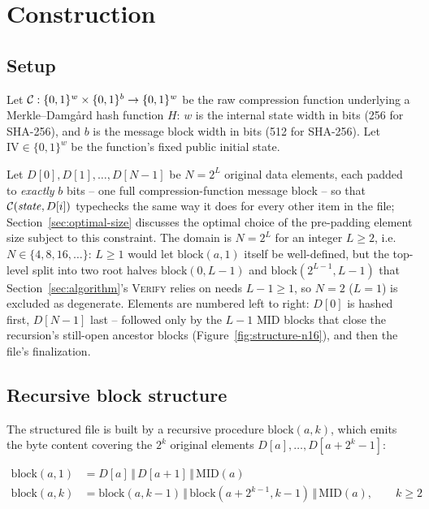 \section{Construction}
\label{sec:construction}

\subsection{Setup}

Let $\mathcal{C}: \{0,1\}^w \times \{0,1\}^b \to \{0,1\}^w$ be the raw compression
function underlying a Merkle--Damg\aa rd hash function $H$: $w$ is the
internal state width in bits (256 for SHA-256), and $b$ is the message
block width in bits (512 for SHA-256). Let $\mathrm{IV} \in \{0,1\}^w$ be
the function's fixed public initial state.

Let $D[0], D[1], \dots, D[N-1]$ be $N = 2^L$ original data elements, each
padded to \emph{exactly} $b$ bits -- one full compression-function message
block -- so that $\mathcal{C}(\mathit{state}, D[i])$ typechecks the same way it does
for every other item in the file; Section~\ref{sec:optimal-size} discusses
the optimal choice of the pre-padding element size subject to this
constraint. The domain is $N = 2^L$ for an integer $L \ge 2$, i.e.\
$N \in \{4, 8, 16, \dots\}$: $L \ge 1$ would let $\mathrm{block}(a,1)$
itself be well-defined, but the top-level split into two root halves
$\mathrm{block}(0,L-1)$ and $\mathrm{block}(2^{L-1},L-1)$ that
Section~\ref{sec:algorithm}'s \textsc{Verify} relies on needs $L-1 \ge 1$,
so $N=2$ ($L=1$) is excluded as degenerate. Elements are numbered left to
right: $D[0]$ is hashed first, $D[N-1]$ last -- followed only by the $L-1$
$\mathrm{MID}$ blocks that close the recursion's still-open ancestor blocks
(Figure~\ref{fig:structure-n16}), and then the file's finalization.

\subsection{Recursive block structure}
\label{sec:recursive-structure}

The structured file is built by a recursive procedure $\mathrm{block}(a,k)$,
which emits the byte content covering the $2^k$ original elements
$D[a], \dots, D[a+2^k-1]$:

\begin{align}
\mathrm{block}(a,1) &= D[a] \,\Vert\, D[a+1] \,\Vert\, \mathrm{MID}(a) \\
\mathrm{block}(a,k) &= \mathrm{block}(a,k-1) \,\Vert\, \mathrm{block}(a+2^{k-1},k-1) \,\Vert\, \mathrm{MID}(a), \qquad k \ge 2
\end{align}

